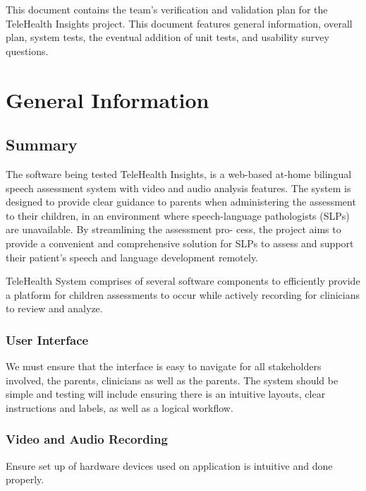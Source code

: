 \documentclass[12pt, titlepage]{article}
\begin{document}
\newpage


\hspace{2 em} This document contains the team's verification and validation plan for the TeleHealth
Insights project. This document features general information, overall plan, system tests,
the eventual addition of unit tests, and usability survey questions.

\section{General Information}

\subsection{Summary}

  The software being tested TeleHealth Insights, is a web-based at-home bilingual
  speech assessment system with video and audio analysis features. The system is designed to provide clear 
  guidance to parents when administering the assessment to their children, in an environment where speech-language
  pathologists (SLPs) are unavailable. By streamlining the assessment pro-
  cess, the project aims to provide a convenient and comprehensive solution
  for SLPs to assess and support their patient's speech and language development remotely.

  TeleHealth System comprises of several software components to efficiently provide 
  a platform for children assessments to occur while actively recording for clinicians to review and analyze. 

  \subsubsection{User Interface}

  We must ensure that the interface is easy to navigate for all stakeholders involved, the parents, 
  clinicians as well as the parents. The system should be simple and testing will include ensuring 
  there is an intuitive layouts, clear instructions and labels, as well as a logical workflow.

  \subsubsection{Video and Audio Recording}

  Ensure set up of hardware devices used on application is intuitive and done properly. 
\end{document}
